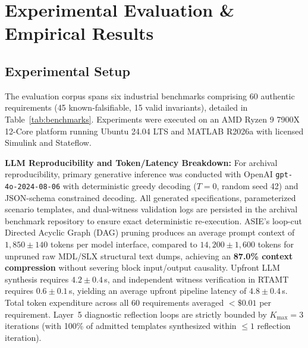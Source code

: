 \documentclass[journal]{IEEEtran}
\begin{document}
\section{Experimental Evaluation \& Empirical Results}

\subsection{Experimental Setup}
The evaluation corpus spans six industrial benchmarks comprising 60 authentic requirements (45 known-falsifiable, 15 valid invariants), detailed in Table~\ref{tab:benchmarks}. Experiments were executed on an AMD Ryzen 9 7900X 12-Core platform running Ubuntu 24.04 LTS and MATLAB R2026a with licensed Simulink and Stateflow.

\noindent\textbf{LLM Reproducibility and Token/Latency Breakdown:}
For archival reproducibility, primary generative inference was conducted with OpenAI \texttt{gpt-4o-2024-08-06} with deterministic greedy decoding ($T = 0$, random seed 42) and JSON-schema constrained decoding. All generated specifications, parameterized scenario templates, and dual-witness validation logs are persisted in the archival benchmark repository to ensure exact deterministic re-execution. 
ASIE's loop-cut Directed Acyclic Graph (DAG) pruning produces an average prompt context of $1,850 \pm 140$ tokens per model interface, compared to $14,200 \pm 1,600$ tokens for unpruned raw MDL/SLX structural text dumps, achieving an \textbf{87.0\% context compression} without severing block input/output causality. Upfront LLM synthesis requires $4.2 \pm 0.4$\,s, and independent witness verification in RTAMT requires $0.6 \pm 0.1$\,s, yielding an average upfront pipeline latency of $4.8 \pm 0.4$\,s. Total token expenditure across all 60 requirements averaged $<\$0.01$ per requirement. Layer~5 diagnostic reflection loops are strictly bounded by $K_{\max} = 3$ iterations (with 100\% of admitted templates synthesized within $\le 1$ reflection iteration).

\begin{table}[!t]
\caption{Industrial Benchmark Corpus Characteristics}
\label{tab:benchmarks}
\centering
{}
\end{table}
\end{document}
